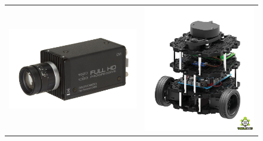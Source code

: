 \documentclass{beamer}
\begin{document}
\begin{frame}[t,fragile]
\begin{columns}[T,totalwidth=\textwidth]
\begin{column}{.48\textwidth}
	\begin{figure}
	    \begin{tabular}{cc}
	        \includegraphics[scale = 0.4]{graphics/camera.jpg}  & \includegraphics[scale = 0.15]{graphics/turtlebot.jpg} \\

\end{tabular}
\end{figure}
\end{column}
\end{columns}
\end{frame}
\end{document}
